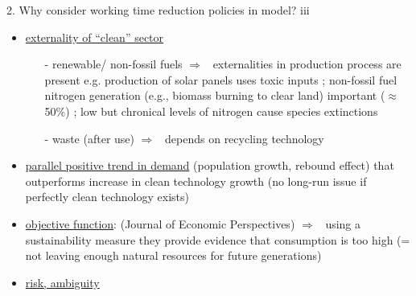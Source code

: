 \documentclass[11pt,aspectratio=169]{beamer}
\newcommand{\ar}{$\Rightarrow$ \ }
\begin{document}
\begin{frame}{2. Why consider working time reduction policies in model? iii}
	\pause
\begin{itemize}
\item<+-> \underline{externality of ``clean'' sector} \citep[see also][]{Dasgupta2021, Brock2005ChapterEmpirics}
\begin{itemize}
	\item[-] renewable/ non-fossil fuels \ar externalities in production process are present e.g. production of solar panels uses toxic inputs \citep{Yue2014DomesticAnalysis}; non-fossil fuel nitrogen generation (e.g., biomass burning to clear land) important ($\approx$ 50\%) \citep{Song2021ImportantEmissions}; low but chronical levels of nitrogen cause species extinctions \citep{Clark2008LossGrasslands}
	\item[-] waste (after use) \ar depends on recycling technology %

\end{itemize}
\item<+-> \underline{parallel positive trend in demand} (population growth, rebound effect) that outperforms increase in clean technology growth \small{(no long-run issue if perfectly clean technology exists)}
\item<+-> \normalsize{\underline{objective function}:} \cite{Arrow2004AreMuch}(Journal of Economic Perspectives) \ar using a sustainability measure they provide evidence that consumption is too high (= not leaving enough natural resources for future generations)
\item<+-> \underline{risk, ambiguity}
\end{itemize}
\end{frame}


%	
%	
\end{document}
